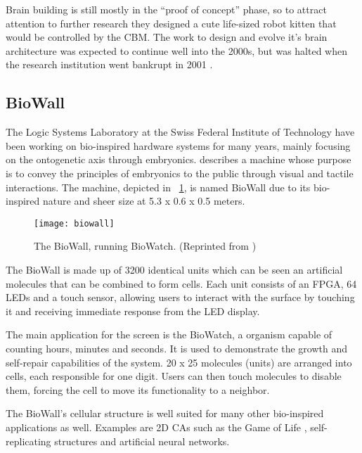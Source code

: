 Brain building is still mostly in the ``proof of concept'' phase, so to attract attention to further research they designed a cute life-sized robot kitten that would be controlled by the CBM.
The work to design and evolve it's brain architecture was expected to continue well into the 2000s, but was halted when the research institution went bankrupt in 2001 \cite{giles2001utopian}.

\subsection{BioWall}

The Logic Systems Laboratory at the Swiss Federal Institute of Technology have been working on bio-inspired hardware systems for many years, mainly focusing on the ontogenetic axis through embryonics.
\cite{tempesti2002biowall} describes a machine whose purpose is to convey the principles of embryonics to the public through visual and tactile interactions.
The machine, depicted in \figurename~\ref{fig:biowall}, is named BioWall due to its bio-inspired nature and sheer size at 5.3 x 0.6 x 0.5 meters.

\begin{figure}[!ht]
    \centering
    \texttt{[image: biowall]}
    \caption[BioWall]{
        The BioWall, running BioWatch.
        (Reprinted from \cite{biowalloverview})
    }
    \label{fig:biowall}
\end{figure}

The BioWall is made up of 3200 identical units which can be seen an artificial molecules that can be combined to form cells.
Each unit consists of an FPGA, 64 LEDs and a touch sensor, allowing users to interact with the surface by touching it and receiving immediate response from the LED display.

The main application for the screen is the BioWatch, a organism capable of counting hours, minutes and seconds.
It is used to demonstrate the growth and self-repair capabilities of the system.
20 x 25 molecules (units) are arranged into cells, each responsible for one digit.
Users can then touch molecules to disable them, forcing the cell to move its functionality to a neighbor.

The BioWall's cellular structure is well suited for many other bio-inspired applications as well.
Examples are 2D CAs such as the Game of Life \cite{gardner1970life}, self-replicating structures and artificial neural networks.

